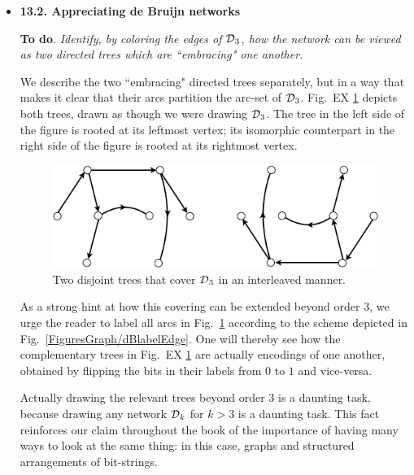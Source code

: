 \begin{itemize}
\item
{\bf 13.2. Appreciating de Bruijn networks}

\smallskip

{\bf To do}.
{\em Identify, by coloring the edges of $\mbox{$\cal D$}_3$, how the network can be viewed as two directed trees which are ``embracing" one another.}

\smallskip

We describe the two ``embracing" directed trees separately, but in a way that makes it clear that their arcs partition the arc-set of $\mbox{$\cal D$}_3$.  Fig.~EX \ref{fig:DeBruijn3Tree} depicts both trees, drawn as though we were drawing $\mbox{$\cal D$}_3$.  The tree in the left side of the figure is rooted at its leftmost vertex;  its isomorphic counterpart in the right side of the figure is rooted at its rightmost vertex. 
\begin{figure}[h]
\begin{center}
        \includegraphics[scale=0.4]{FiguresGraph/DeBruijn3Tree}
        \caption{Two disjoint trees that cover $\mbox{$\cal D$}_3$ in an interleaved manner.}
        \label{fig:DeBruijn3Tree}
\end{center}
\end{figure}

\smallskip

As a strong hint at how this covering can be extended beyond order $3$, we urge the reader to label all arcs in Fig.~\ref{fig:DeBruijn3Tree} according to the scheme depicted in Fig.~\ref{FiguresGraph/dBlabelEdge}.  One will thereby see how the complementary trees in Fig.~EX \ref{fig:DeBruijn3Tree} are actually encodings of one another, obtained by flipping the bits in their labels from $0$ to $1$ and vice-versa.

\smallskip

Actually drawing the relevant trees beyond order $3$ is a daunting task, because drawing any network $\mbox{$\cal D$}_k$ for $k > 3$ is a daunting task.  This fact reinforces our claim throughout the book of the importance of having many ways to look at the same thing: in this case, graphs and structured arrangements of bit-strings.


\end{itemize}
